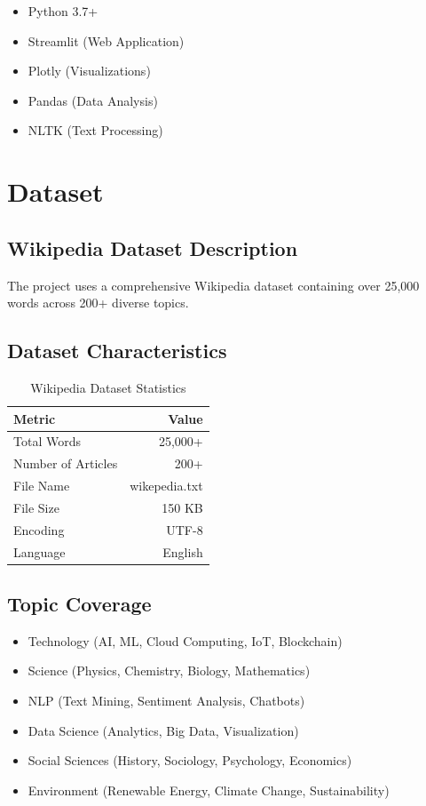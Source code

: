 \documentclass[12pt,a4paper]{report}
\begin{document}
\begin{itemize}
    \item Python 3.7+
    \item Streamlit (Web Application)
    \item Plotly (Visualizations)
    \item Pandas (Data Analysis)
    \item NLTK (Text Processing)
\end{itemize}

\newpage

\chapter{Dataset}

\section{Wikipedia Dataset Description}

The project uses a comprehensive Wikipedia dataset containing over 25,000 words across 200+ diverse topics.

\section{Dataset Characteristics}

\begin{table}[H]
\centering
\begin{tabular}{|l|r|}
\hline
\textbf{Metric} & \textbf{Value} \\
\hline
Total Words & 25,000+ \\
Number of Articles & 200+ \\
File Name & wikepedia.txt \\
File Size & ~150 KB \\
Encoding & UTF-8 \\
Language & English \\
\hline
\end{tabular}
\caption{Wikipedia Dataset Statistics}
\end{table}

\section{Topic Coverage}

\begin{itemize}
    \item Technology (AI, ML, Cloud Computing, IoT, Blockchain)
    \item Science (Physics, Chemistry, Biology, Mathematics)
    \item NLP (Text Mining, Sentiment Analysis, Chatbots)
    \item Data Science (Analytics, Big Data, Visualization)
    \item Social Sciences (History, Sociology, Psychology, Economics)
    \item Environment (Renewable Energy, Climate Change, Sustainability)
\end{itemize}
\end{document}
